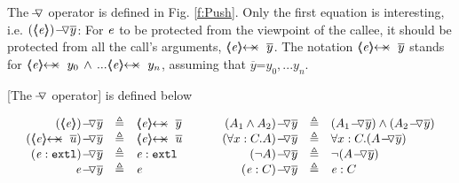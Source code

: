 {%

The  $\!-\!\!\!\,\!{\triangledown}$  operator is  defined in Fig. \ref{f:Push}. 
Only the first equation is interesting, i.e.  $\PushAS y {(\inside \re)}$: For 
$\mathit{e}$ to be protected from the viewpoint of the callee, it should be protected from all the call's arguments,
\ie  $\protectedFrom {\re} {\overline {y}}$. 
The notation $\protectedFrom {\re} {\overline {y}}$   stands for $\protectedFrom \re {y_0}\, \wedge\, ...  \protectedFrom \re {y_n}$, assuming that $\overline y$=${y_0, ... y_n}$.



\begin{definition}
\label{def:push}
[The $\!-\!\!\!\,\!{\triangledown}$  operator] is  defined below

$
\begin{array}{c}
\begin{array}{l}
\begin{array}{rclcrcl}
  \PushAS y {(\inside \re)} & \triangleq &  \protectedFrom \re {\overline {y} }
  & \ \ \  \ &
  \PushAS y   {(A_1  \wedge  A_2)} & \triangleq &  (\PushAS y  { A_1})  \wedge  ( \PushAS y  {A_2} )  
\\ 
 \PushAS y {(\protectedFrom \re {\overline {u}})} &  \triangleq& \protectedFrom \re {\overline {u}} 
  & &
 \PushAS y  {(\forall x:C.A)} & \triangleq & \forall x:C.({\PushAS y A} )  
  \\  
  \PushAS y  {(\external \re)} &  \triangleq & {\external \re}  %
  & & 
  \PushAS y  {(\neg A)} &  \triangleq & \neg( {\PushAS y A} )  
    \\
     \PushAS y  {\re} &  \triangleq&   \re %
    & &
    \PushAS y  {(\re:C)} &  \triangleq&   \re:C 
 \end{array}
\end{array}
\end{array}
$
\label{f:Push}
\end{definition}

}
